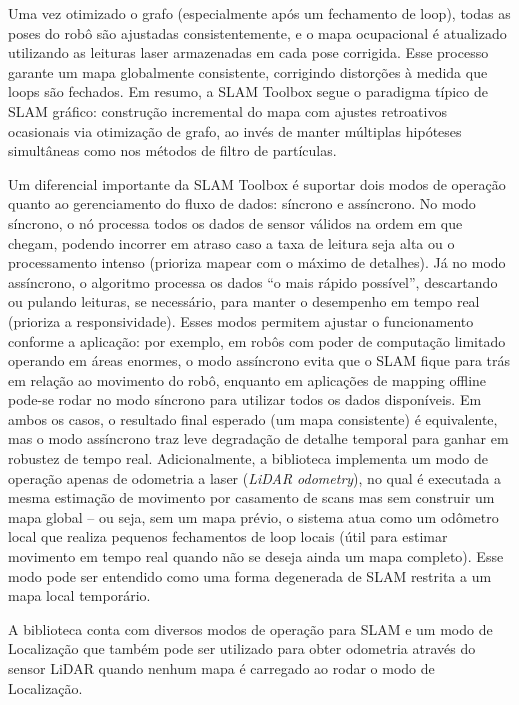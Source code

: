     Uma vez otimizado o grafo (especialmente após um fechamento de loop), todas as poses do robô são ajustadas consistentemente, e o mapa ocupacional é atualizado utilizando as leituras laser armazenadas em cada pose corrigida. Esse processo garante um mapa globalmente consistente, corrigindo distorções à medida que loops são fechados. Em resumo, a SLAM Toolbox segue o paradigma típico de SLAM gráfico: construção incremental do mapa com ajustes retroativos ocasionais via otimização de grafo, ao invés de manter múltiplas hipóteses simultâneas como nos métodos de filtro de partículas.

    Um diferencial importante da SLAM Toolbox é suportar dois modos de operação quanto ao gerenciamento do fluxo de dados: síncrono e assíncrono. No modo síncrono, o nó processa todos os dados de sensor válidos na ordem em que chegam, podendo incorrer em atraso caso a taxa de leitura seja alta ou o processamento intenso (prioriza mapear com o máximo de detalhes). Já no modo assíncrono, o algoritmo processa os dados “o mais rápido possível”, descartando ou pulando leituras, se necessário, para manter o desempenho em tempo real (prioriza a responsividade). Esses modos permitem ajustar o funcionamento conforme a aplicação: por exemplo, em robôs com poder de computação limitado operando em áreas enormes, o modo assíncrono evita que o SLAM fique para trás em relação ao movimento do robô, enquanto em aplicações de mapping offline pode-se rodar no modo síncrono para utilizar todos os dados disponíveis. Em ambos os casos, o resultado final esperado (um mapa consistente) é equivalente, mas o modo assíncrono traz leve degradação de detalhe temporal para ganhar em robustez de tempo real. Adicionalmente, a biblioteca implementa um modo de operação apenas de odometria a laser (\textit{LiDAR odometry}), no qual é executada a mesma estimação de movimento por casamento de scans mas sem construir um mapa global – ou seja, sem um mapa prévio, o sistema atua como um odômetro local que realiza pequenos fechamentos de loop locais (útil para estimar movimento em tempo real quando não se deseja ainda um mapa completo). Esse modo pode ser entendido como uma forma degenerada de SLAM restrita a um mapa local temporário.

    
    A biblioteca conta com diversos modos de operação para SLAM e um modo de Localização que também pode ser utilizado para obter odometria através do sensor LiDAR quando nenhum mapa é carregado ao rodar o modo de Localização. 
    

